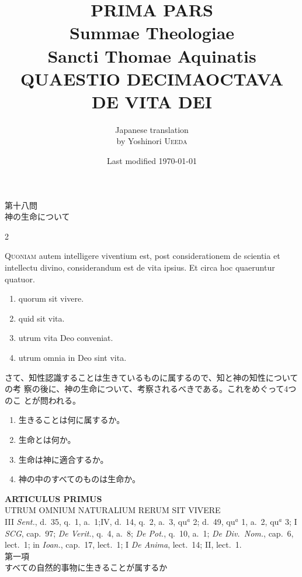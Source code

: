 \documentclass[paper=a4paper,fontsize=10pt,jafontsize=9pt,titlepage]{jlreq}
\title{{\bfseries PRIMA PARS}\\{\Huge Summae Theologiae}\\Sancti Thomae
Aquinatis\\{\sffamily QUAESTIO DECIMAOCTAVA}\\DE VITA DEI}
\author{Japanese translation\\by Yoshinori {\scshape Ueeda}}
\date{Last modified \today}
\begin{document}
\maketitle
\pagestyle{fancy}

\begin{center}
{\Large 第十八問\\神の生命について}
\end{center}

\begin{paracol}{2}

{\huge Q}{\scshape uoniam} autem intelligere viventium est, post
 considerationem de scientia et intellectu divino, considerandum est de
 vita ipsius. Et circa hoc quaeruntur quatuor.

\begin{enumerate}
 \item quorum sit vivere.
 \item quid sit vita.
 \item utrum vita Deo conveniat.
 \item utrum omnia in Deo sint vita.
\end{enumerate}

\switchcolumn

さて、知性認識することは生きているものに属するので、知と神の知性についての考
 察の後に、神の生命について、考察されるべきである。これをめぐって4つのこ
 とが問われる。
 
\begin{enumerate}
 \item 生きることは何に属するか。
 \item 生命とは何か。
 \item 生命は神に適合するか。
 \item 神の中のすべてのものは生命か。
\end{enumerate}

\end{paracol}

\newpage

{}
\setcounter{section}{1}
\setcounter{subsection}{0}
\begin{center}
 {\Large {\bfseries ARTICULUS PRIMUS}}\\
 {\large UTRUM OMNIUM NATURALIUM RERUM SIT VIVERE}\\
 {\footnotesize III {\itshape Sent.}, d.~35, q.~1, a.~1;IV, d.~14, q.~2, a.~3, qu$^a$ 2; d.~49, qu$^a$ 1, a.~2, qu$^a$ 3; I {\itshape SCG}, cap.~97; {\itshape De Verit.}, q.~4, a.~8; {\itshape De Pot.}, q.~10, a.~1; {\itshape De Div.~Nom.}, cap.~6, lect.~1; in {\itshape Ioan.}, cap.~17, lect.~1; I {\itshape De Anima}, lect.~14; II, lect.~1.}\\

 {\Large 第一項\\すべての自然的事物に生きることが属するか}
\end{center}
\end{document}
